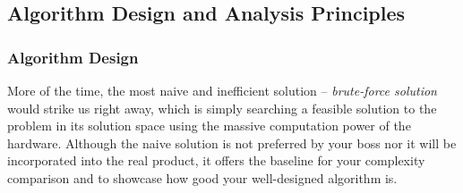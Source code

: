 \documentclass[../main.tex]{subfiles}
\begin{document}
\subsection{Algorithm Design and Analysis Principles}
\subsubsection{Algorithm Design}
\label{sec_algorithm_design}
More of the time, the most naive and inefficient solution -- \textit{brute-force solution} would strike us right away, which is simply searching a feasible solution  to the problem in its solution space using the massive computation power of the hardware. Although the naive solution is not preferred by your boss nor it will be incorporated into the real product, it offers the baseline for your complexity comparison and to showcase how good your well-designed algorithm is.
\end{document}
